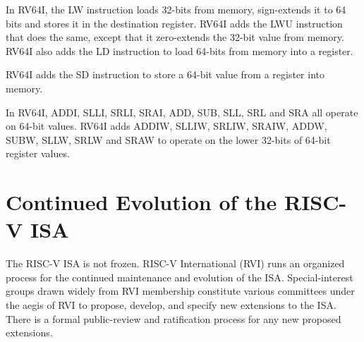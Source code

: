In RV64I, the LW instruction loads 32-bits from memory, sign-extends
it to 64 bits and stores it in the destination register.  RV64I adds
the LWU instruction that does the same, except that it zero-extends
the 32-bit value from memory.  RV64I also adds the LD instruction to
load 64-bits from memory into a register.

RV64I adds the SD instruction to store a 64-bit value from a register
into memory.

In RV64I, ADDI, SLLI, SRLI, SRAI, ADD, SUB, SLL, SRL and SRA all
operate on 64-bit values.  RV64I adds ADDIW, SLLIW, SRLIW, SRAIW,
ADDW, SUBW, SLLW, SRLW and SRAW to operate on the lower 32-bits of
64-bit register values.


\section{Continued Evolution of the RISC-V ISA}


The RISC-V ISA is not frozen.  RISC-V International (RVI) runs an
organized process for the continued maintenance and evolution of the
ISA.  Special-interest groups drawn widely from RVI membership
constitute various committees under the aegis of RVI to propose,
develop, and specify new extensions to the ISA.  There is a formal
public-review and ratification process for any new proposed
extensions.

